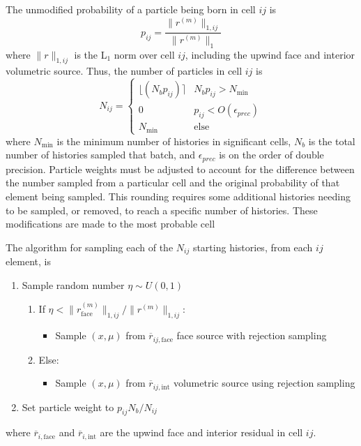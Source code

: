 The unmodified probability of a particle being born in cell $ij$ is 
\begin{equation}
    p_{ij} = \frac{\|r^{(m)}\|_{1,{ij}}}{\|r^{(m)}\|_1}
\end{equation}
where $\|r\|_{1,ij}$ is the L$_1$ norm over cell $ij$, including the upwind face and interior
volumetric source.
Thus, the number of
particles in cell $ij$ is 
\begin{equation}
    N_{ij} = 
\left\{\begin{matrix}
    \lfloor(N_bp_{ij})\rceil & N_bp_{ij} > N_{\min}
    \\ 0 & p_{ij} < O(\epsilon_{prec})
\\ N_{\min} & \text{else}
\end{matrix}\right.
\end{equation}
where $N_{\min}$ is the minimum number of histories in significant cells, $N_b$ is the
total number of histories sampled that batch, and
$\epsilon_{prec}$ is on the order of double precision.  
Particle weights must be adjusted to account for
the difference between the number sampled from a particular cell and the original probability
of that element being sampled.  This rounding requires some additional histories
needing to be sampled, or removed, to reach a specific number of histories.  These
modifications are made to the most probable cell

The algorithm for sampling each of the $N_{ij}$ starting histories, from each $ij$ element, is
\begin{enumerate}
    \item Sample random number $\eta\sim U(0,1)$ 
    \begin{enumerate}
        \item If $\eta < \|r^{(m)}_{\text{face}}\|_{1,ij}/\|r^{(m)}\|_{1,ij}$:
            \begin{itemize}
                \item Sample $(x,\mu)$ from $\overline r_{ij,\text{face}}$ face source with
                    rejection sampling
            \end{itemize}
        \item Else:
            \begin{itemize}
                \item Sample $(x,\mu)$ from $\overline r_{ij,\text{int}}$ volumetric source
                    using rejection sampling
            \end{itemize}
    \end{enumerate}
\item Set particle weight to $p_{ij}N_b/N_{ij}$
\end{enumerate}
where $\overline r_{i,\text{face}}$ and $\overline r_{i,\text{int}}$ are the upwind face and
interior residual in cell $ij$.

